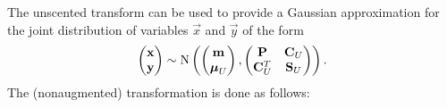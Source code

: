 The unscented transform can be used to provide a Gaussian
approximation for the joint distribution of variables $\vec{x}$ and
$\vec{y}$ of the form
%
  \begin{equation}
     \begin{pmatrix} \mathbf{x} \\ \mathbf{y}
     \end{pmatrix} \sim \operatorname{N}\left(
     \begin{pmatrix} \mathbf{m} \\ \boldsymbol{\mu}_U
     \end{pmatrix},
     \begin{pmatrix} \mathbf{P} & \mathbf{C}_U \\ \mathbf{C}_U^T & \mathbf{S}_U
     \end{pmatrix} \right).
  \end{equation}
%
The (nonaugmented) transformation is done as follows:
%
